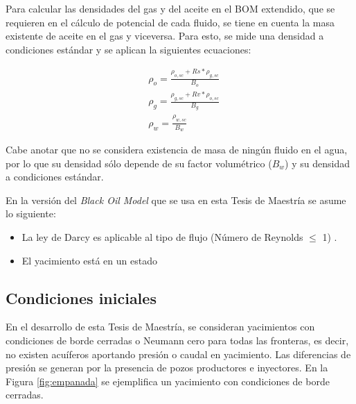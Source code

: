 Para calcular las densidades del gas y del aceite en el BOM extendido, que se requieren en el cálculo de potencial de cada fluido, se tiene en cuenta la masa existente de aceite en el gas y viceversa. Para esto, se mide una densidad a condiciones estándar y se aplican la siguientes ecuaciones:

\begin{align}
	\label{ec:oildensity}&\rho_{o} = \frac{\rho_{o,sc} + Rs*\rho_{g,sc}}{B_{o}}\\
	\label{ec:gasdensity}&\rho_{g} = \frac{\rho_{g,sc} + Rv*\rho_{o,sc}}{B_{g}}\\
	\label{ec:watdensity}&\rho_{w} = \frac{\rho_{w,sc}}{B_{w}}
\end{align}

Cabe anotar que no se considera existencia de masa de ningún fluido en el agua, por lo que su densidad sólo depende de su factor volumétrico ($B_{w}$) y su densidad a condiciones estándar.

En la versión del \textit{Black Oil Model} que se usa en esta Tesis de Maestría se asume lo siguiente:
\begin{itemize}
	\item La ley de Darcy es aplicable al tipo de flujo (Número de Reynolds $\le$ 1) \citep{takhanov2011forchheimer}.
	\item El yacimiento está en un estado 
\end{itemize}





\subsection{Condiciones iniciales}

En el desarrollo de esta Tesis de Maestría, se consideran yacimientos con condiciones de borde cerradas o Neumann cero para todas las fronteras, es decir, no existen acuíferos aportando presión o caudal en yacimiento. Las diferencias de presión se generan por la presencia de pozos productores e inyectores. En la Figura \ref{fig:empanada} se ejemplifica un yacimiento con condiciones de borde cerradas.\\

